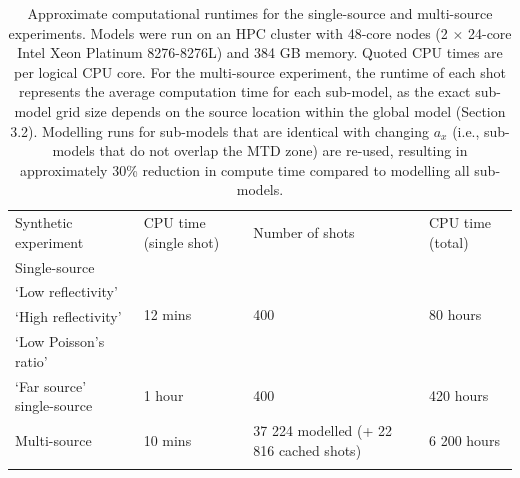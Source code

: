 \documentclass[se,manuscript]{copernicus}
\begin{document}
\begin{table}
    \caption{Approximate computational runtimes for the single-source and multi-source experiments.
    Models were run on an HPC cluster with 48-core nodes (2 $\times$ 24-core Intel Xeon Platinum 8276-8276L) and 384 GB memory.
    Quoted CPU times are per logical CPU core.
    For the multi-source experiment, the runtime of each shot represents the average computation time for each sub-model, as the exact sub-model grid size depends on the source location within the global model (Section 3.2).
    Modelling runs for sub-models that are identical with changing $a_x$ (i.e., sub-models that do not overlap the MTD zone) are re-used, resulting in approximately 30\% reduction in compute time compared to modelling all sub-models.}
    \label{table:compute}
    \begin{tabular}{llll}
        \tophline
        Synthetic experiment & CPU time (single shot) & Number of shots & CPU time (total) \\
        \middlehline
        Single-source & \multirow{4}{*}{12 mins} & \multirow{4}{*}{400} & \multirow{4}{*}{80 hours} \\
        \hspace{\parindent} `Low reflectivity' & & & \\
        \hspace{\parindent} `High reflectivity' & & & \\
        \hspace{\parindent} `Low Poisson's ratio' & & & \\
        \middlehline
        `Far source' single-source & 1 hour & 400 & 420 hours \\
        \middlehline
        Multi-source & 10 mins & 37 224 modelled (+ 22 816 cached shots) & 6 200 hours \\
        \bottomhline
    \end{tabular}
\end{table}
\end{document}
